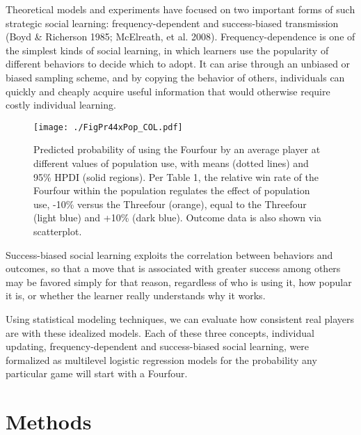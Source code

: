\documentclass{article}
\begin{document}
Theoretical models and experiments have focused on two important forms of such strategic social learning: frequency-dependent and success-biased transmission (Boyd \& Richerson 1985; McElreath, et al. 2008).  Frequency-dependence is one of the simplest kinds of social learning, in which learners use the popularity of different behaviors to decide which to adopt.  It can arise through an unbiased or biased sampling scheme, and by copying the behavior of others, individuals can quickly and cheaply acquire useful information that would otherwise require costly individual learning.

\begin{figure}[t]
\begin{center}
\texttt{[image: ./FigPr44xPop\_COL.pdf]}
\caption{Predicted probability of using the Fourfour by an average player at different values of population use, with means (dotted lines) and 95\% HPDI (solid regions).  Per Table 1, the relative win rate of the Fourfour within the population regulates the effect of population use, -10\% versus the Threefour (orange), equal to the Threefour (light blue) and +10\% (dark blue).  Outcome data is also shown via scatterplot.}
\label{FigPr44}
\end{center}
\end{figure}

Success-biased social learning exploits the correlation between behaviors and outcomes, so that a move that is associated with greater success among others may be favored simply for that reason, regardless of who is using it, how popular it is, or whether the learner really understands why it works.

Using statistical modeling techniques, we can evaluate how consistent real players are with these idealized models.  Each of these three concepts, individual updating, frequency-dependent and success-biased social learning, were formalized as multilevel logistic regression models for the probability any particular game will start with a Fourfour.   


\section{Methods}
\end{document}
